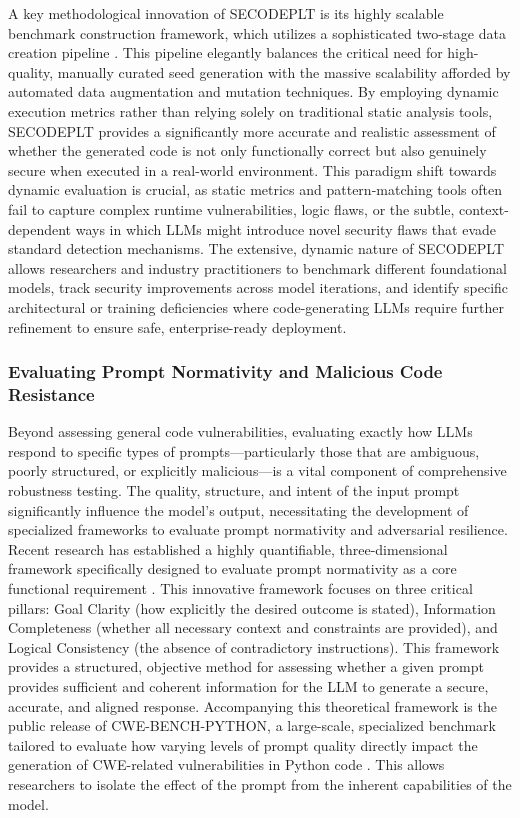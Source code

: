 \documentclass[11pt,a4paper]{article}
\begin{document}
A key methodological innovation of SECODEPLT is its highly scalable benchmark construction framework, which utilizes a sophisticated two-stage data creation pipeline \cite{Nie_2024_Secodeplt, Nie_2025_Secodeplt}. This pipeline elegantly balances the critical need for high-quality, manually curated seed generation with the massive scalability afforded by automated data augmentation and mutation techniques. By employing dynamic execution metrics rather than relying solely on traditional static analysis tools, SECODEPLT provides a significantly more accurate and realistic assessment of whether the generated code is not only functionally correct but also genuinely secure when executed in a real-world environment. This paradigm shift towards dynamic evaluation is crucial, as static metrics and pattern-matching tools often fail to capture complex runtime vulnerabilities, logic flaws, or the subtle, context-dependent ways in which LLMs might introduce novel security flaws that evade standard detection mechanisms. The extensive, dynamic nature of SECODEPLT allows researchers and industry practitioners to benchmark different foundational models, track security improvements across model iterations, and identify specific architectural or training deficiencies where code-generating LLMs require further refinement to ensure safe, enterprise-ready deployment.

\subsubsection{Evaluating Prompt Normativity and Malicious Code Resistance}

Beyond assessing general code vulnerabilities, evaluating exactly how LLMs respond to specific types of prompts---particularly those that are ambiguous, poorly structured, or explicitly malicious---is a vital component of comprehensive robustness testing. The quality, structure, and intent of the input prompt significantly influence the model's output, necessitating the development of specialized frameworks to evaluate prompt normativity and adversarial resilience. Recent research has established a highly quantifiable, three-dimensional framework specifically designed to evaluate prompt normativity as a core functional requirement \cite{Wang_2025_Prompt}. This innovative framework focuses on three critical pillars: Goal Clarity (how explicitly the desired outcome is stated), Information Completeness (whether all necessary context and constraints are provided), and Logical Consistency (the absence of contradictory instructions). This framework provides a structured, objective method for assessing whether a given prompt provides sufficient and coherent information for the LLM to generate a secure, accurate, and aligned response. Accompanying this theoretical framework is the public release of CWE-BENCH-PYTHON, a large-scale, specialized benchmark tailored to evaluate how varying levels of prompt quality directly impact the generation of CWE-related vulnerabilities in Python code \cite{Wang_2025_Prompt}. This allows researchers to isolate the effect of the prompt from the inherent capabilities of the model.
\end{document}
